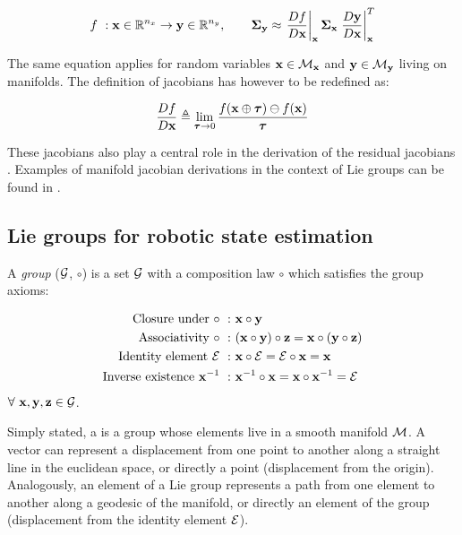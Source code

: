 \begin{equation}
    f~: {\bf x} \in \mathbb{R}^{n_x} \rightarrow {\bf y} \in \mathbb{R}^{n_y}, \quad \quad {\bm \Sigma}_{{\bf y}} \approx 
                \left.\frac{D f}{D {\bf x}} \right|_{{\bf x}}   {\bm \Sigma}_{{\bf x}}    \left.\frac{D {\bf y}}{D {\bf x}}\right|_{{\bf x}}^T
    \label{eq:cov_propagation}
\end{equation}

The same equation applies for random variables ${\bf x} \in \mathcal{M}_{{\bf x}}$ and ${\bf y} \in \mathcal{M}_{{\bf y}}$ living on manifolds. The definition of jacobians has however
to be redefined as:

\begin{equation}
    \frac{D f}{D {\bf x}} \triangleq \lim_{{\bm \tau} \to 0} \frac{f({\bf x} \oplus {\bm \tau}) \ominus f({\bf x})}{{\bm \tau}}
\end{equation}

These jacobians also play a central role in the derivation of the residual jacobians .
Examples of manifold jacobian derivations in the context of Lie groups can be found in \cite{sola2018micro}.  



\subsection{Lie groups for robotic state estimation}
A \textit{group} ($\mathcal{G}$, $\circ$) is a set $\mathcal{G}$ with a composition law $\circ$ which satisfies the group axioms:

\begin{align}
    \text{Closure under}~\circ~:&~{\bf x} \circ {\bf y} \\ 
    \text{Associativity}~\circ~:&~({\bf x} \circ {\bf y}) \circ {\bf z} = {\bf x} \circ ({\bf y} \circ {\bf z}) \\ 
    \text{Identity element}~\mathcal{E}~:&~{\bf x} \circ \mathcal{E} = \mathcal{E} \circ {\bf x} = {\bf x} \\ 
    \text{Inverse existence}~{\bf x}^{-1}~:&~{\bf x}^{-1} \circ {\bf x} = {\bf x} \circ {\bf x}^{-1} = \mathcal{E}
\end{align}
$\forall~{\bf x},{\bf y},{\bf z} \in \mathcal{G}$.

Simply stated, a  is a group whose elements live in a smooth manifold $\mathcal{M}$.
A vector can represent a displacement from one point to another along a straight line in the euclidean space, or directly a point (displacement from the origin).
Analogously, an element of a Lie group represents a path from one element to another along a geodesic of the manifold, or directly an element of the group 
(displacement from the identity element $\mathcal{E}$).


